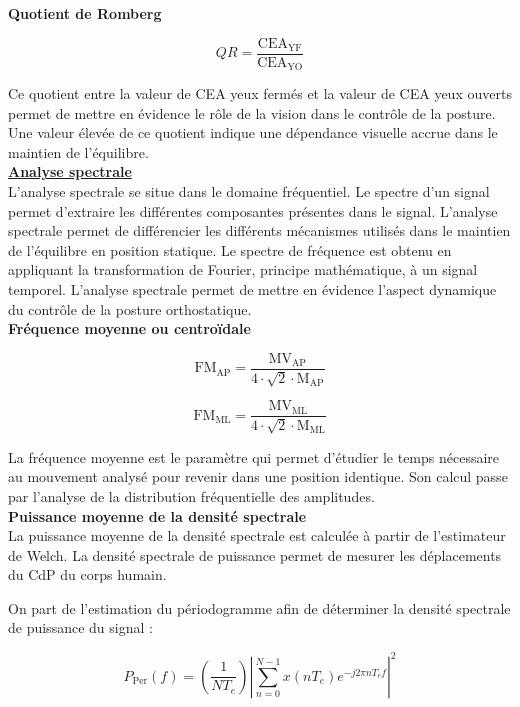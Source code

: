 \textbf{Quotient de Romberg}


\[
QR = \frac{\text{CEA}_{\text{YF}}}{\text{CEA}_{\text{YO}}}\tag{13}
\]

Ce quotient entre la valeur de CEA yeux fermés et la valeur de CEA yeux ouverts permet de mettre en évidence le rôle de la vision dans le contrôle de la posture. 
Une valeur élevée de ce quotient indique une dépendance visuelle accrue dans le maintien de l'équilibre.\\

\textbf{\underline{Analyse spectrale}}\\

L'analyse spectrale se situe dans le domaine fréquentiel. 
Le spectre d'un signal permet d'extraire les différentes composantes présentes dans le signal. 
L'analyse spectrale permet de différencier les différents mécanismes utilisés dans le maintien de l'équilibre en position statique.
Le spectre de fréquence est obtenu en appliquant la transformation de Fourier, principe mathématique, à un signal temporel. 
L'analyse spectrale permet de mettre en évidence l'aspect dynamique du contrôle de la posture orthostatique.\\


\textbf{Fréquence moyenne ou centroïdale}


\[
\text{FM}_{\text{AP}} = \frac{\text{MV}_{\text{AP}}}{4 \cdot \sqrt{2} \cdot \text{M}_{\text{AP}}} \tag{14}
\]

\[
\text{FM}_{\text{ML}} = \frac{\text{MV}_{\text{ML}}}{4 \cdot \sqrt{2} \cdot \text{M}_{\text{ML}}} \tag{15}
\]

La fréquence moyenne est le paramètre qui permet d'étudier le temps nécessaire au mouvement analysé pour revenir dans une position identique. 
Son calcul passe par l'analyse de la distribution fréquentielle des amplitudes.\\



\textbf{Puissance moyenne de la densité spectrale}\\



La puissance moyenne de la densité spectrale est calculée à partir de l'estimateur de Welch. 
La densité spectrale de puissance permet de mesurer les déplacements du CdP du corps humain.

On part de l'estimation du périodogramme afin de déterminer la densité spectrale de puissance du signal : 

\[
P_{\text{Per}}(f) = \left( \frac{1}{N T_e} \right) \left| \sum_{n=0}^{N-1} x(nT_e)e^{-j2\pi n T_e f} \right|^2 \tag{16}
\]

